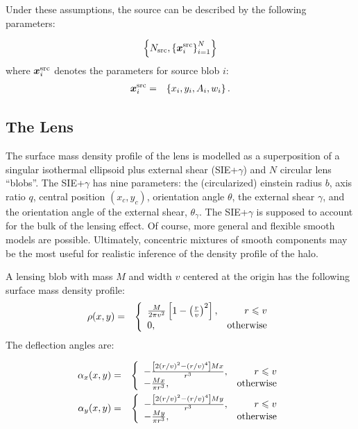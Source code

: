 \documentclass[useAMS,usenatbib]{mn2e}
\begin{document}
Under these assumptions, the source can be described by the following
parameters:

\begin{eqnarray}
\left\{
N_{\rm src}, \left\{\boldsymbol{x}^{\rm src}_i\right\}_{i=1}^N
\right\}
\end{eqnarray}
where $\boldsymbol{x}^{\rm src}_i$ denotes the parameters for source blob $i$:
\begin{eqnarray}
\boldsymbol{x}^{\rm src}_i &=& \left\{x_i, y_i, A_i, w_i
\right\}.
\end{eqnarray}


\subsection{The Lens}
The surface mass density profile of the lens is modelled as a superposition
of a singular isothermal ellipsoid plus external shear (SIE+$\gamma$) and
$N$ circular lens ``blobs''. The SIE+$\gamma$ has nine parameters:
the (circularized) einstein radius $b$, axis ratio $q$, central position
$(x_c, y_c)$, orientation angle $\theta$, the external shear $\gamma$, and the
orientation angle of the external shear, $\theta_{\gamma}$. The SIE+$\gamma$
is supposed to account for the bulk of the lensing effect. Of course, more
general and flexible smooth models are possible. Ultimately, concentric
mixtures of smooth components may be the most useful for realistic inference
of the density profile of the halo.

A lensing blob with mass $M$ and width $v$
centered at the origin has the following surface mass density profile:
\begin{eqnarray}
\rho(x, y) &=& \left\{
\begin{array}{lr}
\frac{M}{2\pi v^2}\left[1 - \left(\frac{r}{v}\right)^2\right], & r \leq v\\
0, & \textnormal{otherwise}
\end{array}
\right.
\end{eqnarray}
The deflection angles are:


\begin{eqnarray}
\alpha_x(x, y) &=&
\left\{
\begin{array}{lr}
-\frac{\left[2(r/v)^2 - (r/v)^4\right]Mx}{r^3}, & r \leq v\\
-\frac{Mx}{\pi r^3}, & \textnormal{otherwise}
\end{array}
\right.\\
\alpha_y(x, y) &=&
\left\{
\begin{array}{lr}
-\frac{\left[2(r/v)^2 - (r/v)^4\right]My}{r^3}, & r \leq v\\
-\frac{My}{\pi r^3}, & \textnormal{otherwise}
\end{array}
\right.
\end{eqnarray}
\end{document}
